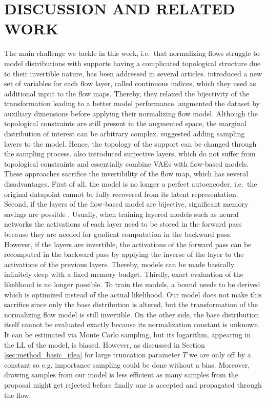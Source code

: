 \documentclass[twoside]{article}
\begin{document}
\section{DISCUSSION AND RELATED WORK}
\label{sec:discussion}

The main challenge we tackle in this work, i.e.\ that normalizing flows struggle to model distributions with supports having a complicated topological structure due to their invertible nature, has been addressed in several articles. \cite{Cornish2020} introduced a new set of variables for each flow layer, called continuous indices, which they used as additional input to the flow maps. Thereby, they relaxed the bijectivity of the transformation leading to a better model performance. \cite{Huang2020} augmented the dataset by auxiliary dimensions before applying their normalizing flow model. Although the topological constraints are still present in the augmented space, the marginal distribution of interest can be arbitrary complex. \cite{Wu2020,Nielsen2020} suggested adding sampling layers to the model. Hence, the topology of the support can be changed through the sampling process. \cite{Nielsen2020} also introduced surjective layers, which do not suffer from topological constraints and essentially combine VAEs with flow-based models. These approaches sacrifice the invertibility of the flow map, which has several disadvantages. First of all, the model is no longer a perfect autoencoder, i.e.\ the original datapoint cannot be fully recovered from its latent representation. Second, if the layers of the flow-based model are bijective, significant memory savings are possible \citep{Gomez2017}. Usually, when training layered models such as neural networks the activations of each layer need to be stored in the forward pass because they are needed for gradient computation in the backward pass. However, if the layers are invertible, the activations of the forward pass can be recomputed in the backward pass by applying the inverse of the layer to the activations of the previous layers. Thereby, models can be made basically infinitely deep  with a fixed memory budget. Thirdly, exact evaluation of the likelihood is no longer possible. To train the models, a bound needs to be derived which is optimized instead of the actual likelihood. Our model does not make this sacrifice since only the base distribution is altered, but the transformation of the normalizing flow model is still invertible. On the other side, the base distribution itself cannot be evaluated exactly because its normalization constant is unknown. It can be estimated via Monte Carlo sampling, but its logarithm, appearing in the LL of the model, is biased. However, as discussed in Section \ref{sec:method_basic_idea} for large truncation parameter $T$ we are only off by a constant so e.g. importance sampling could be done without a bias. Moreover, drawing samples from our model is less efficient as many samples from the proposal might get rejected before finally one is accepted and propagated through the flow.
\end{document}
